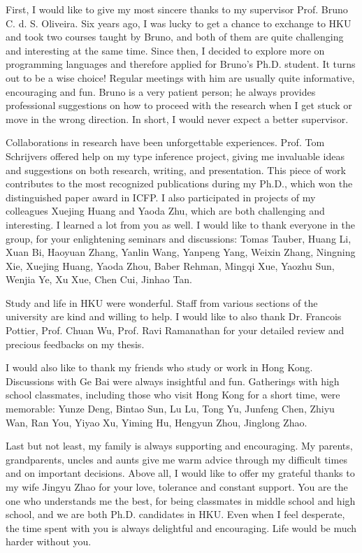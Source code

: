 
First, I would like to give my most sincere thanks to my supervisor Prof. Bruno C. d. S. Oliveira.
Six years ago, I was lucky to get a chance to exchange to HKU and
took two courses taught by Bruno,
and both of them are quite challenging and interesting at the same time.
Since then, I decided to explore more on programming languages and
therefore applied for Bruno's Ph.D. student.
It turns out to be a wise choice!
Regular meetings with him are usually quite informative, encouraging and fun.
Bruno is a very patient person;
he always provides professional suggestions on how to proceed
with the research when I get stuck or move in the wrong direction.
In short, I would never expect a better supervisor.

Collaborations in research have been unforgettable experiences.
Prof. Tom Schrijvers offered help on my type inference project,
giving me invaluable ideas and suggestions on both research, writing, and presentation.
This piece of work contributes to the most recognized publications during my Ph.D.,
which won the distinguished paper award in ICFP.
I also participated in projects of my colleagues Xuejing Huang and Yaoda Zhu,
which are both challenging and interesting. I learned a lot from you as well.
I would like to thank everyone in the group, for your enlightening seminars and discussions:
%
Tomas Tauber, Huang Li, Xuan Bi, Haoyuan Zhang, Yanlin Wang, Yanpeng Yang,
Weixin Zhang, Ningning Xie, 
%
Xuejing Huang, Yaoda Zhou, Baber Rehman, Mingqi Xue, Yaozhu Sun, Wenjia Ye, Xu Xue,
Chen Cui, Jinhao Tan.


Study and life in HKU were wonderful. Staff from various sections of the university
are kind and willing to help.
I would like to also thank Dr. Francois Pottier, Prof. Chuan Wu, Prof. Ravi Ramanathan
for your detailed review and precious feedbacks on my thesis.


I would also like to thank my friends who study or work in Hong Kong.
Discussions with Ge Bai were always insightful and fun.
Gatherings with high school classmates, including those who visit Hong Kong for a short time,
were memorable:
Yunze Deng, Bintao Sun, Lu Lu, Tong Yu, Junfeng Chen, Zhiyu Wan, Ran You,
Yiyao Xu, Yiming Hu, Hengyun Zhou, Jinglong Zhao.


Last but not least, my family is always supporting and encouraging.
My parents, grandparents, uncles and aunts give me warm advice through
my difficult times and on important decisions.
Above all, I would like to offer my grateful thanks to my wife Jingyu Zhao
for your love, tolerance and constant support.
You are the one who understands me the best, for being classmates in
middle school and high school, and we are both Ph.D. candidates in HKU.
Even when I feel desperate, the time spent with you is always delightful and encouraging.
Life would be much harder without you.

